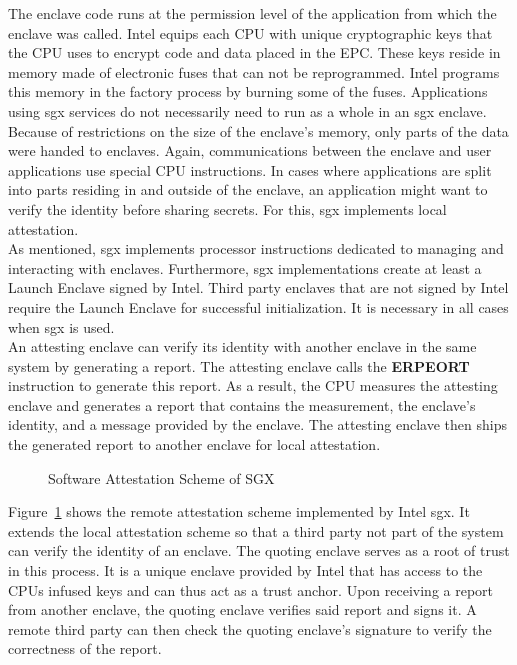 The enclave code runs at the permission level of
the application from which the enclave was called. Intel equips each CPU with
unique cryptographic keys that the CPU uses to encrypt code and data placed in
the EPC. These keys reside in memory made of electronic fuses that can not be
reprogrammed. Intel programs this memory in the factory process by burning some
of the fuses. Applications using \gls{sgx} services do not necessarily need to run as
a whole in an \gls{sgx} enclave. Because of restrictions on the size of the enclave's
memory, only parts of the data were handed to enclaves. Again, communications
between the enclave and user applications use special CPU instructions. In cases
where applications are split into parts residing in and outside of the enclave,
an application might want to verify the identity before sharing secrets. For
this, \gls{sgx} implements local attestation.\\

As mentioned, \gls{sgx} implements processor instructions dedicated to managing and
interacting with enclaves. Furthermore, \gls{sgx} implementations create at least a
Launch Enclave signed by Intel. Third party enclaves that are not signed by
Intel require the Launch Enclave for successful initialization. It is necessary
in all cases when \gls{sgx} is used.\\

An attesting enclave can verify its identity with another enclave in the same
system by generating a report. The attesting enclave calls the \textbf{ERPEORT}
instruction to generate this report. As a result, the CPU measures the attesting
enclave and generates a report that contains the measurement, the enclave's
identity, and a message provided by the enclave. The attesting enclave then
ships the generated report to another enclave for local attestation.
\begin{center}
    \begin{figure}
        \centering
        
        \caption{Software Attestation Scheme of SGX}
        \label{fig:state:tee:sgx_attestation}
    \end{figure}
\end{center}
Figure~\ref{fig:state:tee:sgx_attestation} shows the remote attestation scheme
implemented by Intel \gls{sgx}. It extends the local attestation scheme so that a
third party not part of the system can verify the identity of an enclave. The
quoting enclave serves as a root of trust in this process. It is a unique
enclave provided by Intel that has access to the CPUs infused keys and can thus
act as a trust anchor. Upon receiving a report from another enclave, the quoting
enclave verifies said report and signs it. A remote third party can then check
the quoting enclave's signature to verify the correctness of the report.

